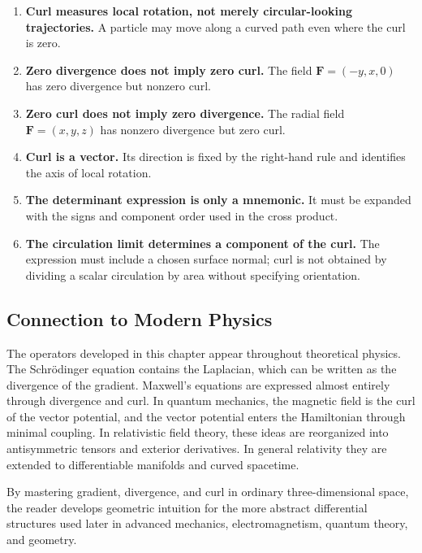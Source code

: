 \begin{enumerate}
  \item \textbf{Curl measures local rotation, not merely circular-looking
  trajectories.} A particle may move along a curved path even where the curl is
  zero.

  \item \textbf{Zero divergence does not imply zero curl.} The field
  $\mathbf F=(-y,x,0)$ has zero divergence but nonzero curl.

  \item \textbf{Zero curl does not imply zero divergence.} The radial field
  $\mathbf F=(x,y,z)$ has nonzero divergence but zero curl.

  \item \textbf{Curl is a vector.} Its direction is fixed by the right-hand
  rule and identifies the axis of local rotation.

  \item \textbf{The determinant expression is only a mnemonic.} It must be
  expanded with the signs and component order used in the cross product.

  \item \textbf{The circulation limit determines a component of the curl.}
  The expression must include a chosen surface normal; curl is not obtained by
  dividing a scalar circulation by area without specifying orientation.
\end{enumerate}

\subsection{Connection to Modern Physics}

The operators developed in this chapter appear throughout theoretical physics.
The Schr\"odinger equation contains the Laplacian, which can be written as the
divergence of the gradient. Maxwell's equations are expressed almost entirely
through divergence and curl. In quantum mechanics, the magnetic field is the
curl of the vector potential, and the vector potential enters the Hamiltonian
through minimal coupling. In relativistic field theory, these ideas are
reorganized into antisymmetric tensors and exterior derivatives. In general
relativity they are extended to differentiable manifolds and curved spacetime.

By mastering gradient, divergence, and curl in ordinary three-dimensional
space, the reader develops geometric intuition for the more abstract
differential structures used later in advanced mechanics, electromagnetism,
quantum theory, and geometry.

